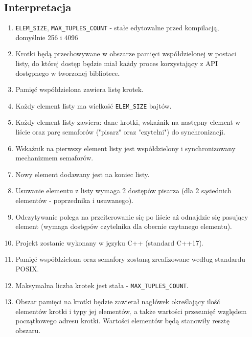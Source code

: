 \documentclass[a4paper]{article}
\begin{document}
	\subsection{Interpretacja}
	\begin{enumerate}
		\item \texttt{ELEM\_SIZE}, \texttt{MAX\_TUPLES\_COUNT} - stałe edytowalne przed kompilacją, domyślnie 256 i 4096
		\item Krotki będą przechowywane w obszarze pamięci współdzielonej w postaci listy, do której dostęp będzie miał każdy proces korzystający z API dostępnego w tworzonej bibliotece.
		\item Pamięć współdzielona zawiera listę krotek.
		\item Każdy element listy ma wielkość \texttt{ELEM\_SIZE} bajtów.
		\item Każdy element listy zawiera: dane krotki, wskaźnik na następny element w liście oraz parę semaforów ("pisarz" oraz "czytelni") do synchronizacji.
		\item Wskaźnik na pierwszy element listy jest współdzielony i synchronizowany mechanizmem semaforów.
		\item Nowy element dodawany jest na koniec listy.
		\item Usuwanie elementu z listy wymaga 2 dostępów pisarza (dla 2 sąsiednich elementów - poprzednika i usuwanego).
		\item Odczytywanie polega na przeiterowanie się po liście aż odnajdzie się pasujący element (wymaga dostępów czytelnika dla obecnie czytanego elementu).
		\item Projekt zostanie wykonany w języku C++ (standard C++17).
		\item Pamięć współdzielona oraz semafory zostaną zrealizowane według standardu POSIX.
		\item Maksymalna liczba krotek jest stała - \texttt{MAX\_TUPLES\_COUNT}.
		\item Obszar pamięci na krotki będzie zawierał nagłówek określający ilość elementów krotki i typy jej elementów, a także wartości przesunięć względem początkowego adresu krotki. Wartości elementów będą stanowiły resztę obszaru.
	\end{enumerate}
	
\end{document}
